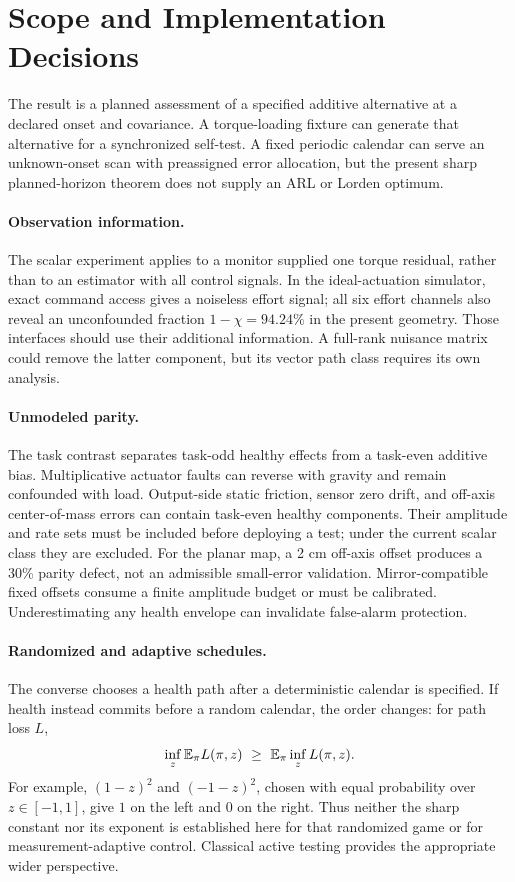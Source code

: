 \section{Scope and Implementation Decisions}\label{sec:scope}
The result is a planned assessment of a specified additive alternative at a declared onset and covariance. A torque-loading fixture can generate that alternative for a synchronized self-test.  A fixed periodic calendar can serve an unknown-onset scan with preassigned error allocation, but the present sharp planned-horizon theorem does not supply an ARL or Lorden optimum.

\paragraph{Observation information.}
The scalar experiment applies to a monitor supplied one torque residual, rather than to an estimator with all control signals. In the ideal-actuation simulator, exact command access gives a noiseless effort signal; all six effort channels also reveal an unconfounded fraction $1-\chi=94.24\%$ in the present geometry. Those interfaces should use their additional information. A full-rank nuisance matrix could remove the latter component, but its vector path class requires its own analysis. 

\paragraph{Unmodeled parity.}
The task contrast separates task-odd healthy effects from a task-even additive bias. Multiplicative actuator faults can reverse with gravity and remain confounded with load. Output-side static friction, sensor zero drift, and off-axis center-of-mass errors can contain task-even healthy components. Their amplitude and rate sets must be included before deploying a test; under the current scalar class they are excluded. For the planar map, a 2 cm off-axis offset produces a 30\% parity defect, not an admissible small-error validation. Mirror-compatible fixed offsets consume a finite amplitude budget or must be calibrated. Underestimating any health envelope can invalidate false-alarm protection.

\paragraph{Randomized and adaptive schedules.}
The converse chooses a health path after a deterministic calendar is specified. If health instead commits before a random calendar, the order changes: for path loss $L$,
\begin{equation}
 \inf_z\mathbb E_\pi L(\pi,z)\ \ge\ \mathbb E_\pi\inf_z L(\pi,z).
\end{equation}
For example, $(1-z)^2$ and $(-1-z)^2$, chosen with equal probability over $z\in[-1,1]$, give $1$ on the left and $0$ on the right. Thus neither the sharp constant nor its exponent is established here for that randomized game or for measurement-adaptive control. Classical active testing \cite{chernoff,naghshvar} provides the appropriate wider perspective.

